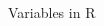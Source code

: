 \documentclass[aspectratio=169]{beamer}\usepackage[]{graphicx}\usepackage[]{color}
\begin{document}
\begin{frame}{Variables in R}
\begin{columns}
\begin{column}{0.50\textwidth}
\begin{center}
		\end{center}
	\end{column}
\end{columns}
\end{frame}

% 
\end{document}
